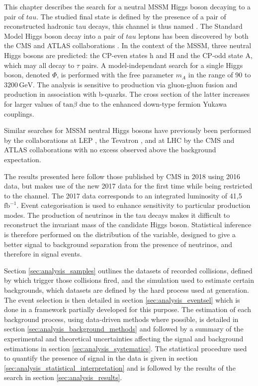 This chapter describes the search for a neutral MSSM Higgs boson decaying to a pair of $tau$. The studied final state is defined by the presence of a pair of reconstructed hadronic tau decays, this channel is thus named \tauh\tauh. The Standard Model Higgs boson decay into a pair of $tau$ leptons has been discovered by both the CMS and ATLAS collaborations \cite{ATLASHtt,CMSHtt}. In the context of the MSSM, three neutral Higgs bosons are predicted: the CP-even states h and H and the CP-odd state A, which may all decay to $\tau$ pairs. A model-independant search for a single Higgs boson, denoted $\Phi$, is performed with the free parameter $m_A$ in the range of $90$ to $3200\,\mathrm{GeV}$. The analysis is sensitive to production via gluon-gluon fusion and production in association with b-quarks. The cross section of the latter increases for larger values of $\mathrm{tan}\beta$ due to the enhanced down-type fermion Yukawa couplings.  %

Similar searches for MSSM neutral Higgs bosons have previously been performed by the collaborations at LEP \cite{Schael2006}, the Tevatron \cite{Benjamin:2010xb}, and at LHC by the CMS and ATLAS collaborations \cite{Aaboud2018,Sirunyan2018} with no excess observed above the background expectation. 

The results presented here follow those published by CMS in 2018 using 2016 data, but makes use of the new 2017 data for the first time while being restricted to the \tauh\tauh channel. The 2017 data corresponds to an integrated luminosity of 41,5 $\mathrm{fb^{-1}}$. Event categorisation is used to enhance sensitivity to particular production modes. The production of neutrinos in the tau decays makes it difficult to reconstruct the invariant mass of the candidate Higgs boson. Statistical inference is therefore performed on the distribution of the \mttot variable, designed to give a better signal to background separation from the presence of neutrinos, and therefore \MET in signal events.

Section \ref{sec:analysis_samples} outlines the datasets of recorded collisions, defined by which trigger those collisions fired, and the simulation used to estimate certain backgrounds, which datasets are defined by the hard process used at generation. The event selection is then detailed in section \ref{sec:analysis_eventsel} which is done in a framework partially developed for this purpose. The estimation of each background process, using data-driven methods where possible, is detailed in section \ref{sec:analysis_background_methods} and followed by a summary of the experimental and theoretical uncertainties affecting the signal and background estimations in section \ref{sec:analysis_systematics}. The statistical procedure used to quantify the presence of signal in the data is given in section \ref{sec:analysis_statistical_interpretation} and is followed by the results of the search in section \ref{sec:analysis_results}.

